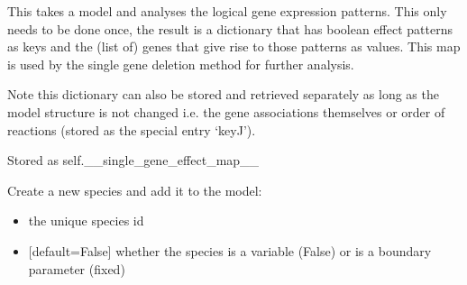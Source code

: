 \documentclass[letterpaper,10pt,english]{sphinxmanual}
\begin{document}
\begin{fulllineitems}

\begin{fulllineitems}
\label{\detokenize{modules_doc:cbmpy.CBModel.Model.createSingleGeneEffectMap}}
\pysigstartsignatures
{}
\pysigstopsignatures
\sphinxAtStartPar
This takes a model and analyses the logical gene expression patterns. This only needs to be done once,
the result is a dictionary that has boolean effect patterns as keys and the (list of) genes that give rise to
those patterns as values. This map is used by the single gene deletion method for further analysis.

\sphinxAtStartPar
Note this dictionary can also be stored and retrieved separately as long as the model structure is not changed i.e.
the gene associations themselves or order of reactions (stored as the special entry ‘keyJ’).

\sphinxAtStartPar
Stored as self.\_\_single\_gene\_effect\_map\_\_

\end{fulllineitems}


\begin{fulllineitems}
\label{\detokenize{modules_doc:cbmpy.CBModel.Model.createSpecies}}
\pysigstartsignatures
{}
\pysigstopsignatures
\sphinxAtStartPar
Create a new species and add it to the model:
\begin{itemize}
\item {} 
\sphinxAtStartPar
{} the unique species id

\item {} 
\sphinxAtStartPar
{} {[}default=False{]} whether the species is a variable (False) or is a boundary parameter (fixed)


\end{itemize}
\end{fulllineitems}
\end{fulllineitems}
\end{document}

